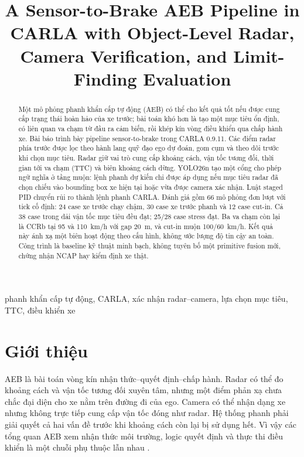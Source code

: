 \documentclass[conference]{IEEEtran}
\title{A Sensor-to-Brake AEB Pipeline in CARLA with Object-Level Radar, Camera Verification, and Limit-Finding Evaluation}
\author{
\IEEEauthorblockN{Mai Việt Hoàng và Phạm Đức An}
\IEEEauthorblockA{
\textit{Đại học Bách khoa Hà Nội}\\
Hà Nội, Việt Nam\\
hoangmai04222@gmail.com
}
}
\begin{document}
\maketitle

\begin{abstract}
Một mô phỏng phanh khẩn cấp tự động (AEB) có thể cho kết quả tốt nếu được cung
cấp trạng thái hoàn hảo của xe trước; bài toán khó hơn là tạo một mục tiêu ổn
định, có liên quan va chạm từ đầu ra cảm biến, rồi khép kín vòng điều khiển qua
chấp hành xe. Bài báo trình bày pipeline sensor-to-brake trong CARLA 0.9.11. Các
điểm radar phía trước được lọc theo hành lang quỹ đạo ego dự đoán, gom cụm và
theo dõi trước khi chọn mục tiêu. Radar giữ vai trò cung cấp khoảng cách, vận tốc
tương đối, thời gian tới va chạm (TTC) và biên khoảng cách dừng. YOLO26n tạo một
cổng cho phép ngữ nghĩa ở tầng muộn: lệnh phanh dự kiến chỉ được áp dụng nếu mục
tiêu radar đã chọn chiếu vào bounding box xe hiện tại hoặc vừa được camera xác
nhận. Luật staged PID chuyển rủi ro thành lệnh phanh CARLA. Đánh giá gồm 66 mô
phỏng đơn lượt với tick cố định: 24 case xe trước chạy chậm, 30 case xe trước
phanh và 12 case cut-in. Cả 38 case trong dải vận tốc mục tiêu đều đạt; 25/28
case stress đạt. Ba va chạm còn lại là CCRb tại 95 và 110~km/h với gap 20~m, và
cut-in muộn 100/60~km/h. Kết quả này ánh xạ một biên hoạt động theo cấu hình,
không ước lượng độ tin cậy an toàn. Công trình là baseline kỹ thuật minh bạch,
không tuyên bố một primitive fusion mới, chứng nhận NCAP hay kiểm định xe thật.
\end{abstract}

\begin{IEEEkeywords}
phanh khẩn cấp tự động, CARLA, xác nhận radar--camera, lựa chọn mục tiêu, TTC,
điều khiển xe
\end{IEEEkeywords}

\section{Giới thiệu}
AEB là bài toán vòng kín nhận thức--quyết định--chấp hành. Radar có thể đo khoảng
cách và vận tốc tương đối xuyên tâm, nhưng một điểm phản xạ chưa chắc đại diện
cho xe nằm trên đường đi của ego. Camera có thể nhận dạng xe nhưng không trực
tiếp cung cấp vận tốc đóng như radar. Hệ thống phanh phải giải quyết cả hai vấn
đề trước khi khoảng cách còn lại bị sử dụng hết. Vì vậy các tổng quan AEB xem
nhận thức môi trường, logic quyết định và thực thi điều khiển là một chuỗi phụ
thuộc lẫn nhau \cite{yang2022aebreview}.
\end{document}
